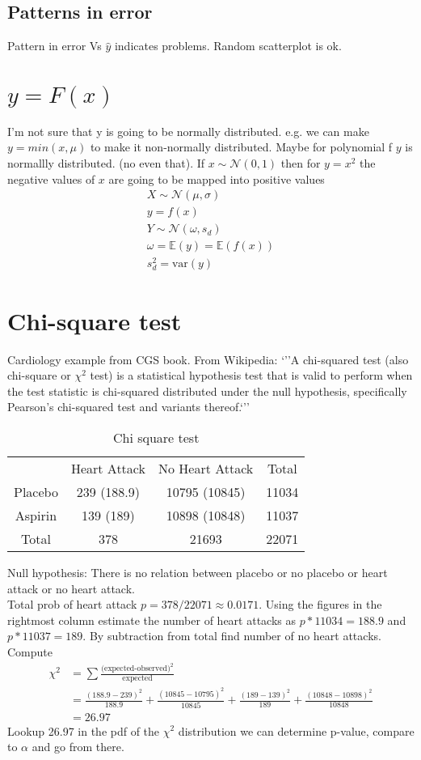 \documentclass{article}
\newcommand{\ber}{\begin{eqnarray}}
\newcommand{\eer}{\end{eqnarray}}
\newcommand{\ra}[1]{\renewcommand{\arraystretch}{#1}}
\begin{document}
\subsection{Patterns in error}
Pattern in error Vs $\hat{y}$ indicates problems. Random scatterplot is ok.
\section{$y=F(x)$}
I'm not sure that y is going to be normally distributed. e.g. we can make $y=min(x,\mu)$ to make it non-normally distributed. Maybe for polynomial f $y$ is normallly distributed. (no even that). If $x\sim\mathcal{N}(0,1)$ then for $y=x^2$ the negative values of $x$ are going to be mapped into positive values\\
\ber
X \sim \mathcal{N}(\mu,\sigma)\\
y = f(x) \\
Y \sim \mathcal{N}(\omega,s_d)\\
\omega = \mathbb{E}(y) = \mathbb{E}(f(x))\\
s_d^2 = \text{var}(y)
\eer
\section{Chi-square test}
Cardiology example from CGS book. From Wikipedia: `''A chi-squared test (also chi-square or $\chi^2$ test) is a statistical hypothesis test that is valid to perform when the test statistic is chi-squared distributed under the null hypothesis, specifically Pearson's chi-squared test and variants thereof.`''
\begin{table}\centering
  \ra{1.3}
  \begin{tabular}{cccc}
    \toprule
            & Heart Attack & No Heart Attack & Total\\
    Placebo &      239 (188.9) &  10795  (10845)    & 11034 \\ 
    Aspirin &      139 (189)   &  10898  (10848)    & 11037\\
    Total   &    378       &  21693          & 22071 \\     
    \midrule
  \end{tabular}
  \caption{\label{tab:chi2} Chi square test}
\end{table}    
Null hypothesis: There is no relation between placebo  or no placebo or heart attack or no heart attack.\\
Total prob of heart attack $p=378/22071\approx{0.0171}$. Using the figures in the rightmost column estimate the number of heart attacks as $p*11034=188.9$ and $p*11037=189$. By subtraction from total find number of no heart attacks. Compute
\begin{align}
  \chi^2 &= \sum \frac{\text{(expected-observed})^2}{\text{expected}} \\
  &= \frac{(188.9-239)^2}{188.9} + \frac{(10845-10795)^2}{10845} + \frac{(189-139)^2}{189} + \frac{(10848-10898)^2}{10848}\\
  &= 26.97
\end{align}
Lookup 26.97 in the pdf of the $\chi^2$ distribution we can determine p-value, compare to $\alpha$ and go from there.
%
%
\end{document}
